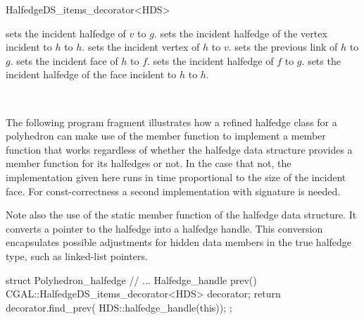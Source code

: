 \begin{ccRefClass}{HalfedgeDS_items_decorator<HDS>}

    {sets the incident halfedge of $v$ to $g$.}
\ccGlue
{}
    {sets the incident halfedge of the vertex incident to $h$ to $h$.}
\ccGlue
{}
    {sets the incident vertex of $h$ to $v$.}
\ccGlue
{}
    {sets the previous link of $h$ to $g$.}
\ccGlue
{}
    {sets the incident face of $h$ to $f$.}
\ccGlue
{}
    {sets the incident halfedge of $f$ to $g$.}
\ccGlue
{}
    {sets the incident halfedge of the face incident to $h$ to $h$.}


\ccSeeAlso

\\

\ccExample

The following program fragment illustrates how a refined halfedge
class for a polyhedron can make use of the  member
function to implement a  member function that works
regardless of whether the halfedge data structure  provides a
 member function for its halfedges or not. In the case that not,
the implementation given here runs in time proportional to the size of the 
incident face. For const-correctness a second implementation with signature
 is needed.

Note also the use of the static member function 
of the halfedge data structure. It converts a pointer to the halfedge
into a halfedge handle. This conversion encapsulates possible
adjustments for hidden data members in the true halfedge type, such as
linked-list pointers.

\begin{ccExampleCode}
struct Polyhedron_halfedge {
    // ...
    Halfedge_handle  prev() {
        CGAL::HalfedgeDS_items_decorator<HDS> decorator;
        return decorator.find_prev( HDS::halfedge_handle(this));
    }
};
\end{ccExampleCode}


\end{ccRefClass}

\ccRefPageEnd

